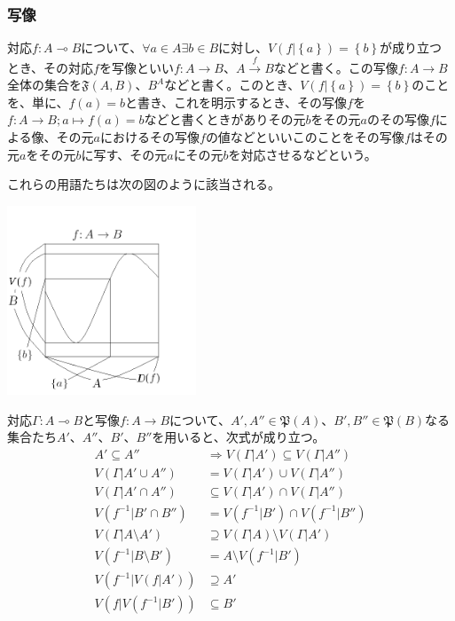 \documentclass[a4paper]{jsarticle}
\begin{document}
\subsubsection{写像}%
対応$f:A \multimap B$について、$\forall a \in A\exists b \in B$に対し、$V\left( f|\left\{ a \right\} \right) = \left\{ b \right\}$が成り立つとき、その対応$f$を写像といい$f:A \rightarrow B$、$A\overset{f}{\rightarrow}B$などと書く。この写像$f:A \rightarrow B$全体の集合を$\mathfrak{F}(A,B)$、$B^{A}$などと書く。このとき、$V\left( f|\left\{ a \right\} \right) = \left\{ b \right\}$のことを、単に、$f(a) = b$と書き、これを明示するとき、その写像$f$を$f:A \rightarrow B;a \mapsto f(a) = b$などと書くときがありその元$b$をその元$a$のその写像$f$による像、その元$a$におけるその写像$f$の値などといいこのことをその写像$f$はその元$a$をその元$b$に写す、その元$a$にその元$b$を対応させるなどという。\par
これらの用語たちは次の図のように該当される。
\begin{center}
\includegraphics[width=160pt]{1.2.1.b.png}
\end{center}
\begin{thm}
\label{1.2.2.8}
対応$\varGamma:A \multimap B$と写像$f:A \rightarrow B$について、$A',A''\in \mathfrak{P}(A)$、$B',B''\in \mathfrak{P}(B)$なる集合たち$A'$、$A''$、$B'$、$B''$を用いると、次式が成り立つ。
\begin{align*}
A' \subseteq A'' &\Rightarrow V\left( \varGamma|A' \right) \subseteq V\left( \varGamma|A'' \right)\\
V\left( \varGamma|A' \cup A'' \right) &= V\left( \varGamma|A' \right) \cup V\left( \varGamma|A'' \right)\\
V\left( \varGamma|A' \cap A'' \right) &\subseteq V\left( \varGamma|A' \right) \cap V\left( \varGamma|A'' \right)\\
V\left( f^{- 1}|B' \cap B'' \right) &= V\left( f^{- 1}|B' \right) \cap V\left( f^{- 1}|B'' \right)\\
V\left( \varGamma|A \setminus A' \right) &\supseteq V\left( \varGamma|A \right) \setminus V\left( \varGamma|A' \right)\\
V\left( f^{- 1}|B \setminus B' \right) &= A \setminus V\left( f^{- 1}|B' \right)\\
V\left( f^{- 1}|V\left( f|A' \right) \right) &\supseteq A'\\
V\left( f|V\left( f^{- 1}|B' \right) \right) &\subseteq B'
\end{align*}
\end{thm}
\end{document}
